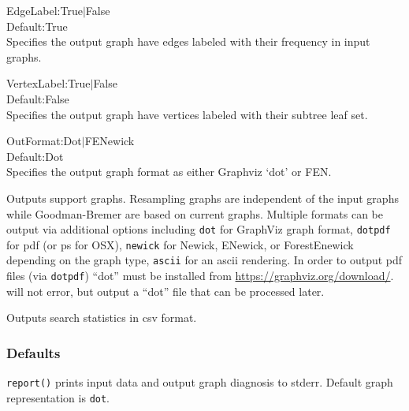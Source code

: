 \begin{description}
\begin{description}
			\item{EdgeLabel:True$\mid$False\\Default:True\\Specifies the output graph have edges 
			labeled with their frequency in input graphs.}
			
			\item{VertexLabel:True$\mid$False\\Default:False\\Specifies the output graph have vertices 
			labeled with their subtree leaf set.}
	
			\item{OutFormat:Dot$\mid$FENewick\\Default:Dot\\Specifies the output graph format 
			as either Graphviz `dot' or FEN.}
			\end{description}	
				
		\item[support] Outputs support graphs. Resampling graphs are independent of the 
		input graphs while Goodman-Bremer are based on current graphs. Multiple formats 
		can be output via additional options including \texttt{dot} for GraphViz graph format, 
		\texttt{dotpdf} for pdf (or ps for OSX), \texttt{newick} for Newick, ENewick, or 
		ForestEnewick depending on the graph type, \texttt{ascii} for an ascii rendering. 
		In order to output pdf files (via \texttt{dotpdf}) ``dot'' must be installed from 
		\url{https://graphviz.org/download/}. \phyg will not error, but output a ``dot'' file that 
		can be processed later.
		
		\item[search] Outputs search statistics in csv format.
		 
	\end{description}			
		
	\subsubsection{Defaults}
		\texttt{report()} prints input data and output graph diagnosis to stderr. Default graph 
		representation is \texttt{dot}.
		
